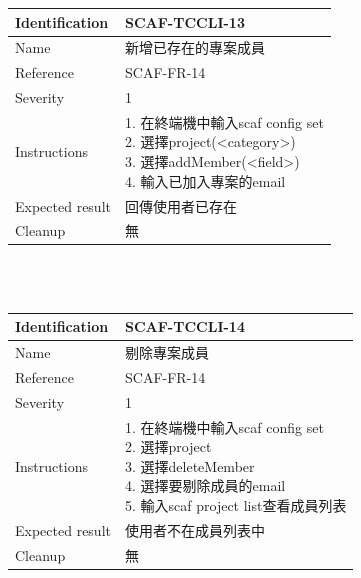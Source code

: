 \documentclass{report}
\begin{document}
\begin{tabularx}{\textwidth}{
  |p{}%
  |p{}|%
  }
  \hline
  \centering Identification &  SCAF-TCCLI-13 \\
  \hline
  \centering Name & 新增已存在的專案成員 \\
  \hline
  \centering Reference & SCAF-FR-14 \\
  \hline
  \centering Severity & 1 \\
  \hline
  \centering Instructions & 
  \makecell[l]{
    1. 在終端機中輸入scaf config set \\
    2. 選擇project(<category>) \\
    3. 選擇addMember(<field>)\\
    4. 輸入已加入專案的email \\
  }\\
  \hline
  \centering Expected result & 回傳使用者已存在 \\
  \hline
  \centering Cleanup & 無 \\
  \hline
\end{tabularx}
\\
\newline
\\


\begin{tabularx}{\textwidth}{
  |p{}%
  |p{}|%
  }
  \hline
  \centering Identification &  SCAF-TCCLI-14 \\
  \hline
  \centering Name & 剔除專案成員 \\
  \hline
  \centering Reference & SCAF-FR-14 \\
  \hline
  \centering Severity & 1 \\
  \hline
  \centering Instructions & 
  \makecell[l]{
    1. 在終端機中輸入scaf config set \\
    2. 選擇project \\
    3. 選擇deleteMember \\
    4. 選擇要剔除成員的email \\
    5. 輸入scaf project list查看成員列表 \\
  }\\
  \hline
  \centering Expected result & 使用者不在成員列表中 \\
  \hline
  \centering Cleanup & 無 \\
  \hline
\end{tabularx}
\\
\newline
\\
\end{document}
